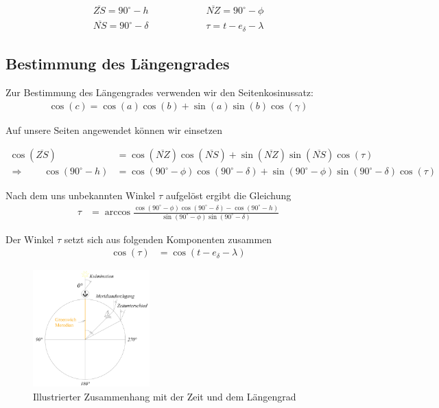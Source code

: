 \begin{refsection}
\begin{align*}
\overline{ZS} = 90^{\circ} - h \quad \quad \quad \quad \quad \quad 
\overline{NZ} = 90^{\circ} - \phi \\
\overline{NS} = 90^{\circ} - \delta \quad \quad \quad \quad \quad \quad 
\tau = t - e_\delta - \lambda 
\end{align*}

\subsection{Bestimmung des Längengrades} \label{BestimmungL} 
Zur Bestimmung des Längengrades verwenden wir den Seitenkosinussatz:
\begin{align*}
\cos(c) = \cos(a)\cos(b) + \sin(a)\sin(b)\cos(\gamma)
\end{align*}

Auf unsere Seiten angewendet können wir einsetzen

\begin{align*}
\cos(\overline{ZS}) &= \cos(\overline{NZ}) \cos(\overline{NS}) + \sin(\overline{NZ}) \sin(\overline{NS}) \cos(\tau) \\
\Rightarrow \quad \quad
\cos(90^{\circ} - h) &= \cos(90^{\circ} - \phi) \cos(90^{\circ} - \delta) + \sin(90^{\circ} - \phi)\sin(90^{\circ} - \delta) \cos(\tau)
\end{align*}

Nach dem uns unbekannten Winkel $\tau$ aufgelöst ergibt die Gleichung
\begin{align*}
\tau &= \arccos 
\frac{ \cos(90^{\circ} - \phi) \cos(90^{\circ} - \delta) - \cos(90^{\circ} - h)} {\sin(90^{\circ} - \phi)\sin(90^{\circ} - \delta)}
\end{align*}

Der Winkel $\tau$ setzt sich aus folgenden Komponenten zusammen
\begin{align*}
\cos (\tau) &= \cos (t - e_\delta - \lambda) 
\end{align*}

\begin{figure}[htbp]
\centering
\includegraphics[width=0.4\textwidth]{kugel/Uhr.jpg}
\caption{Illustrierter Zusammenhang mit der Zeit und dem Längengrad}
\end{figure}


\end{refsection}
